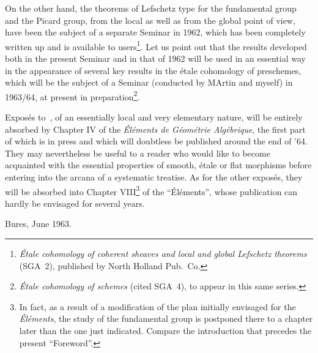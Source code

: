 On the other hand, the theorems of Lefschetz type for the fundamental
group and the Picard group, from the local as well as from the global
point of view, have been the subject of a separate Seminar in 1962,
which has been completely written up and is available to
users\footnote{\emph{\'Etale cohomology of coherent sheaves and local and
global Lefschetz theorems} (SGA~2), published by North Holland Pub.\
Co.}. Let us point out that the results developed both in the present
Seminar and in that of 1962 will be used in an essential way in the
appearance of several key results in the \'etale cohomology of preschemes,
which will be the subject of a Seminar (conducted by M\ptbl Artin and
myself) in 1963/64, at present in preparation\footnote{\emph{\'Etale
cohomology of schemes} (cited SGA~4), to appear in this same series.}.

Expos\'es  to~, of an essentially local and very elementary
nature, will be entirely absorbed by Chapter IV of the
\emph{\'El\'ements de G\'eom\'etrie Alg\'ebrique}, the first part of
which is in press and which will doubtless be published around the end
of '64. They may nevertheless be useful to a reader who would like to
become acquainted with the essential properties of smooth, \'etale or flat
morphisms before entering into the arcana of a systematic treatise. As
for the other expos\'es, they will be absorbed into Chapter
VIII\footnote{In fact, as a result of a modification of the plan
initially envisaged for the \emph{\'El\'ements}, the study of the
fundamental group is postponed there to a chapter later than the one
just indicated. Compare the introduction that precedes the present
``Foreword''.} of the ``\'El\'ements'', whose publication can hardly be
envisaged for several years.

\bigskip\hfill Bures, June 1963.
